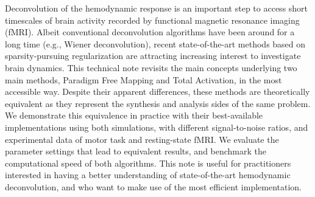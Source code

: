 Deconvolution of the hemodynamic response is an important step to access short timescales of brain activity recorded by functional magnetic resonance imaging (fMRI). Albeit conventional deconvolution algorithms have been around for a long time (e.g., Wiener deconvolution), recent state-of-the-art methods based on sparsity-pursuing regularization are attracting increasing interest to investigate brain dynamics. This technical note revisits the main concepts underlying two main methods, Paradigm Free Mapping and Total Activation, in the most accessible way. Despite their apparent differences, these methods are theoretically equivalent as they represent the synthesis and analysis sides of the same problem. We demonstrate this equivalence in practice with their best-available implementations using both simulations, with different signal-to-noise ratios, and experimental data of motor task and resting-state fMRI. We evaluate the parameter settings that lead to equivalent results, and benchmark the computational speed of both algorithms. This note is useful for practitioners interested in having a better understanding of state-of-the-art hemodynamic deconvolution, and who want to make use of the most efficient implementation.
